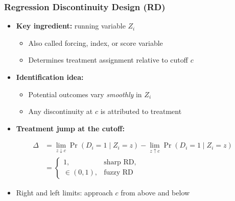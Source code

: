 \documentclass[12pt, compress]{beamer}
\begin{document}
\begin{frame}
	\frametitle{Regression Discontinuity Design (RD)}

\begin{itemize}
	\item \textbf{Key ingredient:} running variable $Z_i$
	\begin{itemize}
		\item Also called forcing, index, or score variable
		\item Determines treatment assignment relative to cutoff $c$
	\end{itemize}
	
	\medskip
	
	\item \textbf{Identification idea:}
	\begin{itemize}
		\item Potential outcomes vary \textit{smoothly} in $Z_i$
		\item Any discontinuity at $c$ is attributed to treatment
	\end{itemize}
	
	\medskip
	
	\item \textbf{Treatment jump at the cutoff:}
\end{itemize}

\begin{align*}
\Delta &= \lim_{z \downarrow c}\Pr(D_i=1 \mid Z_i=z)
- \lim_{z \uparrow c}\Pr(D_i=1 \mid Z_i=z)
\\
&=
\begin{cases}
1, & \text{sharp RD},\\
\in (0,1), & \text{fuzzy RD}
\end{cases}
\end{align*}

\begin{itemize}
	\item Right and left limits: approach $c$ from above and below
\end{itemize}

\end{frame}
\end{document}
